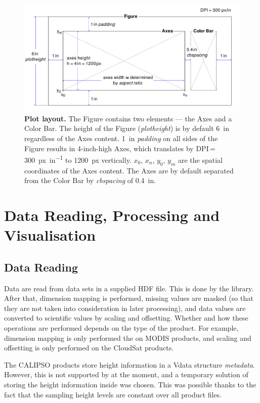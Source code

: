 \begin{figure}[t]
\includegraphics[width=\textwidth]{images/plot-layout2.pdf}
\caption[Plot layout]{\textbf{Plot layout.}
The Figure contains two elements — the Axes and a Color Bar.
The height of the Figure (\textit{plotheight}) is by default \SI{6}{in} regardless of the Axes content.
\SI{1}{in} \textit{padding} on all sides of the Figure results in 4-inch-high Axes,
which translates by DPI\,=\,\SI{300}{px.in^{-1}} to \SI{1200}{px} vertically. $x_0$, $x_n$, $y_0$, $y_m$
are the spatial coordinates of the Axes content. The Axes are by default separated from the Color Bar
by \textit{cbspacing} of \SI{0.4}{in}.
}
\label{fig:plot-layout}
\end{figure}


\section{Data Reading, Processing and Visualisation}

\subsection{Data Reading}
Data are read from data sets in a supplied HDF file. This is done by the
 library. After that, dimension mapping is performed, missing
values are masked (so that they are not taken into consideration in later
processing), and data values are converted to scientific values by scaling and
offsetting. Whether and how these operations are performed depends on the type
of the product. For example, dimension mapping is only performed the on MODIS products,
and scaling and offsetting is only performed on the CloudSat products.

The CALIPSO products store height information in a Vdata structure
\textit{metadata}. However, this is not supported by  at
the moment, and a temporary solution of storing the height information inside
\ccplot was chosen. This was possible thanks to the fact that the sampling height levels are
constant over all product files.


